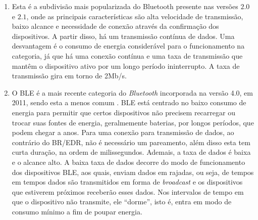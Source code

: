 \begin{enumerate}[label=(\Alph*)]
    
    \item {}
    
    Esta é a subdivisão mais popularizada do Bluetooth presente nas versões $2.0$ e $2.1$, onde as principais características são alta velocidade de transmissão, baixo alcance e necessidade de conexão através da confirmação dos dispositivos. A partir disso, há um transmissão contínua de dados. Uma desvantagem é o consumo de energia considerável para o funcionamento na categoria, já que há uma conexão contínua e uma taxa de transmissão que mantêm o dispositivo ativo por um longo período ininterrupto.
    A taxa de transmissão gira em torno de 2Mb/s.
     
    
    \item {}
    
    
    O BLE é a mais recente categoria do \textit{Bluetooth} incorporada na versão 4.0, em 2011, sendo esta a menos comum \cite{LinkLabs2015}.
    BLE está centrado no baixo consumo de energia para permitir que certos dispositivos não precisem recarregar ou trocar suas fontes de energia, geralmemente baterias, por longos períodos, que podem chegar a anos. 
    Para uma conexão para transmissão de dados, ao contrário do BR/EDR, não é necessário um pareamento, além disso esta tem curta duração, na ordem de milissegundos.
    Ademais, a taxa de dados é baixa e o alcance alto. A baixa taxa de dados decorre do modo de funcionamento dos dispositivos BLE, aos quais, enviam dados em rajadas, ou seja, de tempos em tempos dados são transmitidos em forma de \textit{broadcast} e os dispositivos que estiverem próximos receberão esses dados. Nos intervalos de tempo em que o dispositivo não transmite, ele ``dorme'', isto é, entra em modo de consumo mínimo a fim de poupar energia.
    

\end{enumerate}
